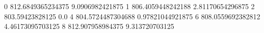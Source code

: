 0 812.6849365234375 9.0906982421875
1 806.4059448242188 2.81170654296875
2 803.59423828125 0.0
4 804.5724487304688 0.97821044921875
6 808.0559692382812 4.46173095703125
8 812.907958984375 9.313720703125

